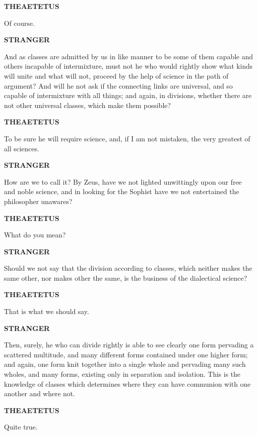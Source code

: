 \documentclass[11pt,letter]{article}
\begin{document}
\par \textbf{THEAETETUS}
\par   Of course.

\par \textbf{STRANGER}
\par   And as classes are admitted by us in like manner to be some of them capable and others incapable of intermixture, must not he who would rightly show what kinds will unite and what will not, proceed by the help of science in the path of argument? And will he not ask if the connecting links are universal, and so capable of intermixture with all things; and again, in divisions, whether there are not other universal classes, which make them possible?

\par \textbf{THEAETETUS}
\par   To be sure he will require science, and, if I am not mistaken, the very greatest of all sciences.

\par \textbf{STRANGER}
\par   How are we to call it? By Zeus, have we not lighted unwittingly upon our free and noble science, and in looking for the Sophist have we not entertained the philosopher unawares?

\par \textbf{THEAETETUS}
\par   What do you mean?

\par \textbf{STRANGER}
\par   Should we not say that the division according to classes, which neither makes the same other, nor makes other the same, is the business of the dialectical science?

\par \textbf{THEAETETUS}
\par   That is what we should say.

\par \textbf{STRANGER}
\par   Then, surely, he who can divide rightly is able to see clearly one form pervading a scattered multitude, and many different forms contained under one higher form; and again, one form knit together into a single whole and pervading many such wholes, and many forms, existing only in separation and isolation. This is the knowledge of classes which determines where they can have communion with one another and where not.

\par \textbf{THEAETETUS}
\par   Quite true.
\end{document}
